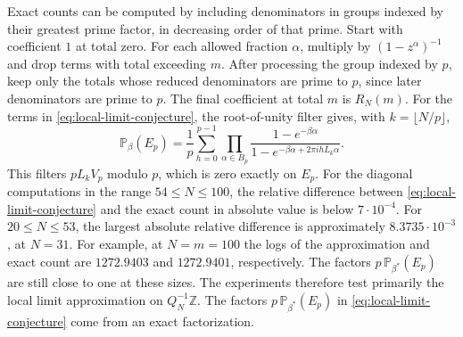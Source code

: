 \documentclass[11pt]{amsart}
\theoremstyle{remark}
\newcommand{\Pp}{\mathbb P}
\begin{document}
Exact counts can be computed by including denominators in groups indexed
by their greatest prime factor, in decreasing order of that prime.
Start with coefficient \(1\) at total zero. For each allowed fraction
\(\alpha\), multiply by \((1-z^\alpha)^{-1}\) and drop terms with
total exceeding \(m\). After processing the group indexed by \(p\),
keep only the totals whose reduced denominators are prime to \(p\),
since later denominators are prime to \(p\). The final coefficient
at total \(m\) is \(R_N(m)\).
For the terms in \eqref{eq:local-limit-conjecture}, the root-of-unity
filter gives, with \(k=\lfloor N/p\rfloor\),
\[
 \Pp_\beta(E_p)=\frac1p\sum_{h=0}^{p-1}
    \prod_{\alpha\in B_p}
    \frac{1-e^{-\beta\alpha}}%
         {1-e^{-\beta\alpha+2\pi i h L_k\alpha}} .
\]
This filters \(pL_kV_p\) modulo \(p\), which is zero exactly on \(E_p\).
For the diagonal computations in the range \(54\le N\le100\), the relative
difference between \eqref{eq:local-limit-conjecture} and the exact count
in absolute value is below \(7\cdot10^{-4}\). For \(20\le N\le53\),
the largest absolute relative difference is approximately
\(8.3735\cdot10^{-3}\), at \(N=31\). For example, at \(N=m=100\) the logs of the
approximation and exact count are \(1272.9403\) and \(1272.9401\),
respectively. The factors \(p\,\Pp_{\beta^\ast}(E_p)\) are still close
to one at these sizes. The experiments therefore test primarily the
local limit approximation on \(Q_N^{-1}\mathbb Z\). The factors
\(p\,\Pp_{\beta^\ast}(E_p)\) in
\eqref{eq:local-limit-conjecture} come from an exact factorization.
\end{document}
